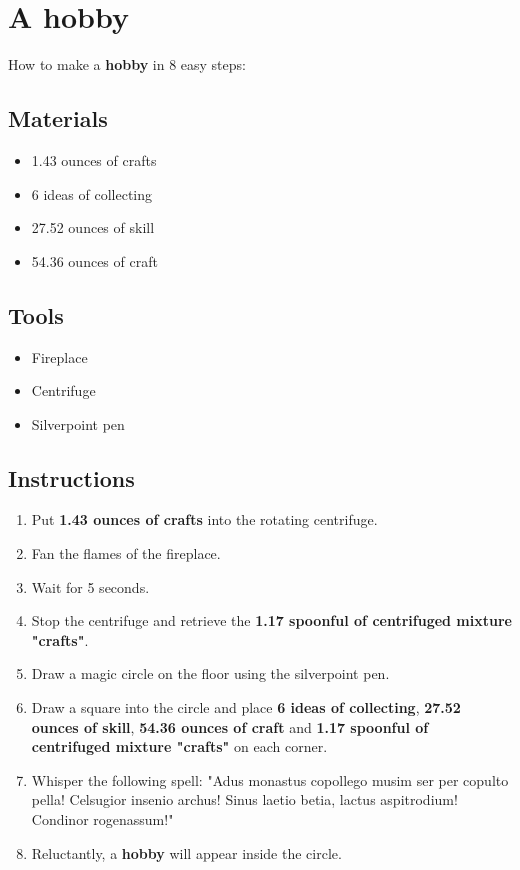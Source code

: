 \documentclass{article}
\begin{document}
\section{A hobby}How to make a \textbf{hobby} in 8 easy steps:

\subsection{Materials}\begin{itemize}
\item 
1.43 ounces of crafts
\item 
6 ideas of collecting
\item 
27.52 ounces of skill
\item 
54.36 ounces of craft
\end{itemize}
\subsection{Tools}\begin{itemize}
\item 
Fireplace
\item 
Centrifuge
\item 
Silverpoint pen
\end{itemize}
\subsection{Instructions}\begin{enumerate}
\item 
Put \textbf{1.43 ounces of crafts} into the rotating centrifuge.
\item 
Fan the flames of the fireplace.
\item 
Wait for 5 seconds.
\item 
Stop the centrifuge and retrieve the \textbf{1.17 spoonful of centrifuged mixture "crafts"}.
\item 
Draw a magic circle on the floor using the silverpoint pen.
\item 
Draw a square into the circle and place \textbf{6 ideas of collecting}, \textbf{27.52 ounces of skill}, \textbf{54.36 ounces of craft} and \textbf{1.17 spoonful of centrifuged mixture "crafts"} on each corner.
\item 
Whisper the following spell: "Adus monastus copollego musim ser per copulto pella! Celsugior insenio archus! Sinus laetio betia, lactus aspitrodium! Condinor rogenassum!"
\item 
Reluctantly, a \textbf{hobby} will appear inside the circle.
\end{enumerate}
\newpage
\end{document}
